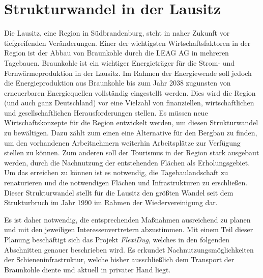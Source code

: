 \section{Strukturwandel in der Lausitz}

Die Lausitz, eine Region in Südbrandenburg, steht in naher Zukunft vor tiefgreifenden Veränderungen. Einer der wichtigsten Wirtschaftsfaktoren in der Region ist der Abbau von Braunkohle durch die LEAG AG in mehreren Tagebauen. Braunkohle ist ein wichtiger Energieträger für die Strom- und Fernwärmeproduktion in der Lausitz. Im Rahmen der Energiewende soll jedoch die Energieproduktion aus Braunkohle bis zum Jahr 2038 zugunsten von erneuerbaren Energiequellen vollständig eingestellt werden. Dies wird die Region (und auch ganz Deutschland) vor eine Vielzahl von finanziellen, wirtschaftlichen und gesellschaftlichen Herausforderungen stellen. Es müssen neue Wirtschaftskonzepte für die Region entwickelt werden, um diesen Strukturwandel zu bewältigen. Dazu zählt zum einen eine Alternative für den Bergbau zu finden, um den vorhandenen Arbeitnehmern weiterhin Arbeitsplätze zur Verfügung stellen zu können. Zum anderen soll der Tourismus in der Region stark ausgebaut werden, durch die Nachnutzung der entstehenden Flächen als Erholungsgebiet. Um das erreichen zu können ist es notwendig, die Tagebaulandschaft zu renaturieren\cite{btu_flexidug_2022} und die notwendigen Flächen und Infrastrukturen zu erschließen. Dieser Strukturwandel stellt für die Lausitz den größten Wandel seit dem Strukturbruch im Jahr 1990 im Rahmen der Wiedervereinigung dar.

Es ist daher notwendig, die entsprechenden Maßnahmen ausreichend zu planen und mit den jeweiligen Interessenvertretern abzustimmen. Mit einem Teil dieser Planung beschäftigt sich das Projekt \emph{FlexiDug}, welches in den folgenden Abschnitten genauer beschrieben wird. Es erkundet Nachnutzungsmöglichkeiten der Schieneninfrastruktur, welche bisher ausschließlich dem Transport der Braunkohle diente und aktuell in privater Hand liegt.